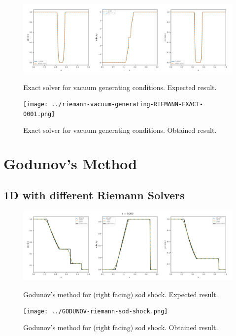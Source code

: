 \begin{figure}[htbp]
    \centering
	\includegraphics[width=.9\textwidth]{./figures/riemann-vacuum-generating-RIEMANN-EXACT-overplotted.png}%
	\caption{Exact solver for vacuum generating conditions. Expected result.}
	\texttt{[image: ../riemann-vacuum-generating-RIEMANN-EXACT-0001.png]}%
	\caption{Exact solver for vacuum generating conditions. Obtained result.}
\end{figure}












\clearpage
\section{Godunov's Method}
\subsection{1D with different Riemann Solvers}

\begin{figure}[htbp]
    \centering
	\includegraphics[width=.9\textwidth]{./figures/GODUNOV-riemann-sod-shock.png}%
	\caption{Godunov's method for (right facing) sod shock. Expected result.}
	\texttt{[image: ../GODUNOV-riemann-sod-shock.png]}%
	\caption{Godunov's method for (right facing) sod shock. Obtained result.}
\end{figure}


